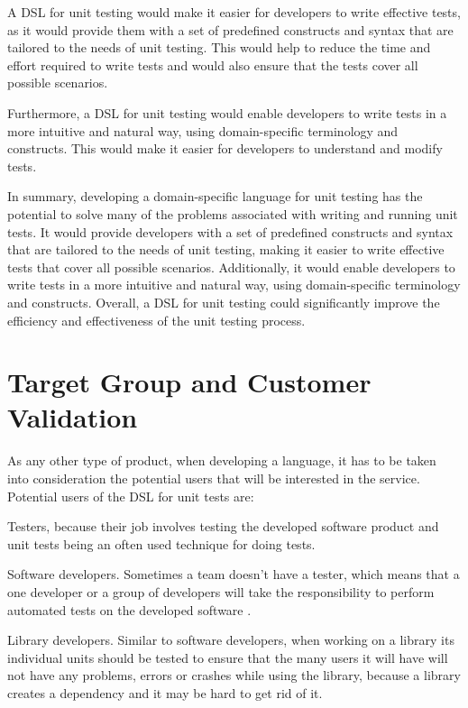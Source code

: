A DSL for unit testing would make it easier for developers to write effective tests, as it would provide them with a set of predefined constructs and syntax that are tailored to the needs of unit testing. This would help to reduce the time and effort required to write tests and would also ensure that the tests cover all possible scenarios.

Furthermore, a DSL for unit testing would enable developers to write tests in a more intuitive and natural way, using domain-specific terminology and constructs. This would make it easier for developers to understand and modify tests.

In summary, developing a domain-specific language for unit testing has the potential to solve many of the problems associated with writing and running unit tests. It would provide developers with a set of predefined constructs and syntax that are tailored to the needs of unit testing, making it easier to write effective tests that cover all possible scenarios. Additionally, it would enable developers to write tests in a more intuitive and natural way, using domain-specific terminology and constructs. Overall, a DSL for unit testing could significantly improve the efficiency and effectiveness of the unit testing process.

\section{Target Group and Customer Validation}

As any other type of product, when developing a language, it has to be taken into consideration the potential users that will be interested in the service. Potential users of the DSL for unit tests are:

Testers, because their job involves testing the developed software product and unit tests being an often used technique for doing tests.

Software developers. Sometimes a team doesn’t have a tester, which means that a one developer or a group of developers will take the responsibility to perform automated tests on the developed software \cite{methodpoet}.

Library developers. Similar to software developers, when working on a library its individual units should be tested to ensure that the many users it will have will not have any problems, errors or crashes while using the library, because a library creates a dependency and it may be hard to get rid of it.


